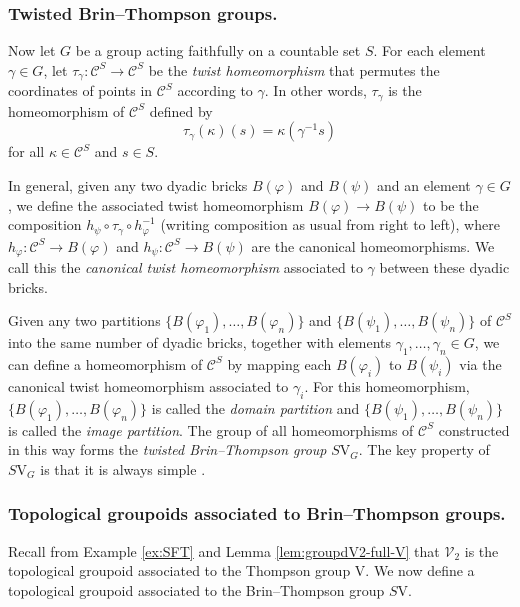 \documentclass[10pt,a4paper]{amsart}
\numberwithin{equation}{section}
\numberwithin{figure}{section}
\theoremstyle{definition}
\newcommand{\cC}{\mathcal{C}}
\newcommand{\V}{\mathrm{V}}
\begin{document}
\subsubsection*{Twisted Brin--Thompson groups.}

Now let $G$ be a group acting faithfully on a countable set $S$. For each element $\gamma \in G$, let $\tau_{\gamma} \colon \cC^{S} \rightarrow \cC^{S}$ be the \emph{twist homeomorphism} that permutes the coordinates of points in $\cC^{S}$ according to $\gamma$. In other words, $\tau_{\gamma}$ is the homeomorphism of $\cC^{S}$ defined by
\begin{equation}
\label{eq:tau-gamma}
\tau_{\gamma}(\kappa)(s) = \kappa (\gamma^{-1} s)
\end{equation}
for all $\kappa \in \cC^{S}$ and $s \in S$. 

In general, given any two dyadic bricks $B(\varphi)$ and $B(\psi)$ and an element $\gamma \in G$, we define the associated twist homeomorphism $B(\varphi) \to B(\psi)$ to be the composition $h_{\psi} \circ \tau_{\gamma} \circ h_{\varphi}^{-1}$ (writing composition as usual from right to left), where $h_{\varphi} \colon \cC^{S} \to B(\varphi)$ and $h_{\psi} \colon \cC^{S} \to B(\psi)$ are the canonical homeomorphisms. We call this the \emph{canonical twist homeomorphism} associated to $\gamma$ between these dyadic bricks.

Given any two partitions $\{B(\varphi_{1}), \ldots, B(\varphi_{n})\}$ and $\{B(\psi_{1}), \ldots, B(\psi_{n})\}$ of $\cC^{S}$ into the same number of dyadic bricks, together with elements $\gamma_{1}, \ldots, \gamma_{n} \in G$, we can define a homeomorphism of $\cC^{S}$ by mapping each $B(\varphi_{i})$ to $B(\psi_{i})$ via the canonical twist homeomorphism associated to $\gamma_{i}$. For this homeomorphism, $\{B(\varphi_{1}), \ldots, B(\varphi_{n})\}$ is called the \emph{domain partition} and $\{B(\psi_{1}), \ldots, B(\psi_{n})\}$ is called the \emph{image partition}. The group of all homeomorphisms of $\cC^{S}$ constructed in this way forms the \emph{twisted Brin--Thompson group} $S\mathrm{V}_G$. The key property of $S\mathrm{V}_G$ is that it is always simple \cite[Theorem 3.4]{BelkZaremsky22}.


\subsubsection*{Topological groupoids associated to Brin--Thompson groups.}

Recall from Example \ref{ex:SFT} and Lemma \ref{lem:groupdV2-full-V} that $\mathcal{V}_2$ is the topological groupoid associated to the Thompson group $\V$. We now define a topological groupoid associated to the Brin--Thompson group $S\V$.
\end{document}
